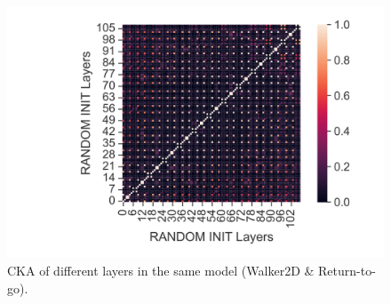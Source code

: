 \documentclass{article}
\begin{document}
\begin{figure}[H]
\begin{minipage}[b]{0.32\linewidth}
        \includegraphics[width=\linewidth]{figs/cka_40_40_dtdt_walker2d_medium_666_reward.png}
    \end{minipage}
    \caption{CKA of different layers in the same model (Walker2D \& Return-to-go).}
\end{figure}
\end{document}
